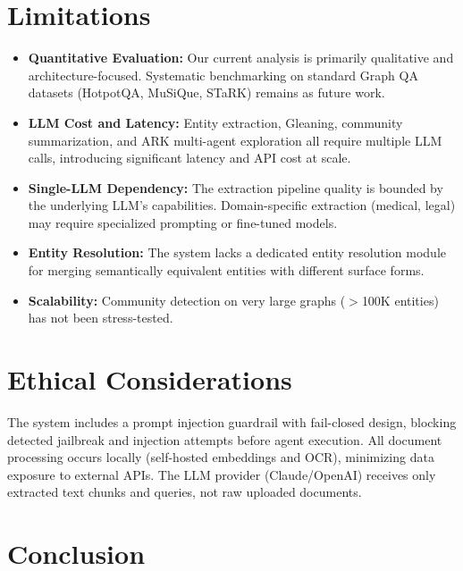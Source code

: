 \documentclass[11pt]{article}
\begin{document}
\section*{Limitations}

\begin{itemize}[leftmargin=*]
    \item \textbf{Quantitative Evaluation:} Our current analysis is primarily qualitative and architecture-focused. Systematic benchmarking on standard Graph QA datasets (HotpotQA, MuSiQue, STaRK) remains as future work.
    \item \textbf{LLM Cost and Latency:} Entity extraction, Gleaning, community summarization, and ARK multi-agent exploration all require multiple LLM calls, introducing significant latency and API cost at scale.
    \item \textbf{Single-LLM Dependency:} The extraction pipeline quality is bounded by the underlying LLM's capabilities. Domain-specific extraction (medical, legal) may require specialized prompting or fine-tuned models.
    \item \textbf{Entity Resolution:} The system lacks a dedicated entity resolution module for merging semantically equivalent entities with different surface forms.
    \item \textbf{Scalability:} Community detection on very large graphs ($>$100K entities) has not been stress-tested.
\end{itemize}

\section*{Ethical Considerations}

The system includes a prompt injection guardrail with fail-closed design, blocking detected jailbreak and injection attempts before agent execution. All document processing occurs locally (self-hosted embeddings and OCR), minimizing data exposure to external APIs. The LLM provider (Claude/OpenAI) receives only extracted text chunks and queries, not raw uploaded documents.

\section{Conclusion}
\end{document}

